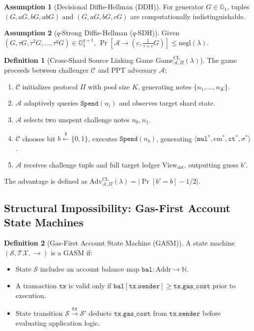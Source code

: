 \documentclass[journal,10pt,twocolumn]{IEEEtran}
\theoremstyle{definition}
\newtheorem{definition}{Definition}
\newtheorem{assumption}{Assumption}
\theoremstyle{remark}
\begin{document}
\begin{assumption}[Decisional Diffie-Hellman (DDH)]
For generator $G \in \mathbb{G}_1$, tuples $(G, aG, bG, abG)$ and $(G, aG, bG, cG)$ are computationally indistinguishable.
\end{assumption}

\begin{assumption}[$q$-Strong Diffie-Hellman ($q$-SDH)]
Given $(G, \tau G, \tau^2 G, \dots, \tau^q G) \in \mathbb{G}_1^{q+1}$, $\Pr[\mathcal{A} \to (c, \frac{1}{\tau + c} G)] \le \text{negl}(\lambda)$.
\end{assumption}

\begin{definition}[Cross-Shard Source Linking Game $\text{Game}^{\text{CL}}_{\mathcal{A}, \Pi}(\lambda)$]
The game proceeds between challenger $\mathcal{C}$ and PPT adversary $\mathcal{A}$:
\begin{enumerate}
    \item $\mathcal{C}$ initializes protocol $\Pi$ with pool size $K$, generating notes $\{n_1, \dots, n_K\}$.
    \item $\mathcal{A}$ adaptively queries $\mathtt{Spend}(n_i)$ and observes target shard state.
    \item $\mathcal{A}$ selects two unspent challenge notes $n_0, n_1$.
    \item $\mathcal{C}$ chooses bit $b \xleftarrow{\$} \{0, 1\}$, executes $\mathtt{Spend}(n_b)$, generating $\langle \mathtt{nul}^*, \text{cm}^*, \mathtt{ct}^*, \sigma^* \rangle$.
    \item $\mathcal{A}$ receives challenge tuple and full target ledger $\text{View}_{\text{dst}}$, outputting guess $b'$.
\end{enumerate}
The advantage is defined as $\text{Adv}^{\text{CL}}_{\mathcal{A}, \Pi}(\lambda) = |\Pr[b' = b] - 1/2|$.
\end{definition}

\subsection{Structural Impossibility: Gas-First Account State Machines}

\begin{definition}[Gas-First Account State Machine (GASM)]
A state machine $(\mathcal{S}, \mathcal{TX}, \to)$ is a GASM if:
\begin{itemize}
    \item State $\mathcal{S}$ includes an account balance map $\mathtt{bal}: \text{Addr} \to \mathbb{N}$.
    \item A transaction $\mathtt{tx}$ is valid only if $\mathtt{bal}[\mathtt{tx.sender}] \ge \mathtt{tx.gas\_cost}$ prior to execution.
    \item State transition $\mathcal{S} \xrightarrow{\mathtt{tx}} \mathcal{S}'$ deducts $\mathtt{tx.gas\_cost}$ from $\mathtt{tx.sender}$ before evaluating application logic.
\end{itemize}
\end{definition}
\end{document}
